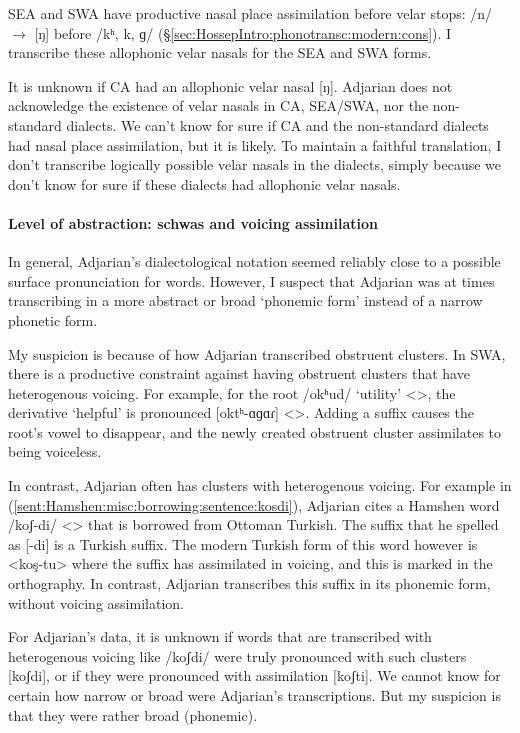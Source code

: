 SEA and SWA have productive nasal place assimilation before velar stops: /n/ $\rightarrow$ [ŋ] before /kʰ, k, ɡ/ (\S\ref{sec:HossepIntro:phonotransc:modern:cons}). I transcribe these allophonic velar nasals for the SEA and SWA forms. 

It is unknown if CA had an allophonic velar nasal [ŋ]. Adjarian does not acknowledge the existence of velar nasals in CA, SEA/SWA, nor the non-standard dialects. We can't know for sure if CA and the non-standard dialects had nasal place assimilation, but it is likely. To maintain a faithful translation, I don't transcribe logically possible velar nasals in the dialects, simply because we don't know for sure if these dialects had allophonic velar nasals. 

\paragraph{Level of abstraction: schwas and   voicing assimilation}

In general, Adjarian's dialectological notation seemed reliably close to a possible surface pronunciation for words. However, I suspect that Adjarian was at times transcribing in a more abstract or broad `phonemic form' instead of a narrow phonetic form. 

My suspicion is because of how Adjarian transcribed obstruent clusters. In SWA, there is a productive constraint against having obstruent clusters that have heterogenous voicing. For example, for the root /okʰud/ `utility' <>, the derivative `helpful' is pronounced [oktʰ-ɑɡɑɾ] <>. Adding a suffix causes the root's vowel to disappear, and the newly created obstruent cluster assimilates to being voiceless. 

In contrast, Adjarian often has clusters with heterogenous voicing. For example in (\ref{sent:Hamshen:misc:borrowing:sentence:kosdi}), Adjarian cites a Hamshen word /koʃ-di/ <> that is borrowed from Ottoman Turkish. The suffix that he spelled as [-di] is a Turkish suffix.  The modern Turkish form of this word however is <koş-tu> where the suffix has assimilated in voicing, and this is marked in the orthography. In contrast, Adjarian transcribes this suffix in its phonemic form, without voicing assimilation.

For Adjarian's data, it is unknown if words that are transcribed with heterogenous voicing like /koʃdi/ were truly pronounced with such clusters [koʃdi], or if they were pronounced with assimilation [koʃti]. We cannot know for certain how narrow or broad were Adjarian's transcriptions. But my suspicion is that they were rather broad (phonemic). 

